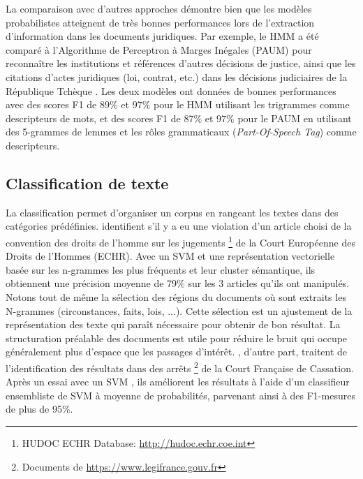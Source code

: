 La comparaison avec d'autres approches démontre bien que les modèles probabilistes atteignent de très bonnes performances lors de l'extraction d'information dans les documents juridiques. Par exemple, le HMM a été comparé à l'Algorithme de Perceptron à Marges Inégales (PAUM) \citep{li2002PAUM} pour reconnaître les institutions et références d'autres décisions de justice, ainsi que les citations d'actes juridiques (loi, contrat, etc.) dans les décisions judiciaires de la République Tchèque \citep{Kriz2014nerinczechdecisions}. Les deux modèles ont données de bonnes performances avec des scores F1 de $ 89 \% $ et $ 97 \% $ pour le HMM utilisant les trigrammes comme descripteurs de mots, et des scores F1 de $ 87 \% $ et $ 97 \% $ pour le PAUM en utilisant des 5-grammes de lemmes et les rôles grammaticaux (\textit{Part-Of-Speech Tag}) comme descripteurs. 


\subsection{Classification de texte}
La classification permet d'organiser un corpus en rangeant les textes dans des catégories prédéfinies.  \cite{Aletras2016predictDecisionECHR} identifient s'il y a eu une violation d'un article choisi de la convention des droits de l'homme sur les jugements \footnote{HUDOC ECHR Database: \url{http://hudoc.echr.coe.int}} de la Court Européenne des Droits de l'Hommes (ECHR). Avec un SVM et une représentation vectorielle basée sur les n-grammes les plus fréquents et leur cluster sémantique, ils obtiennent une précision moyenne de 79\% sur les 3 articles qu'ils ont manipulés. Notons tout de même la sélection des régions du documents où sont extraits les N-grammes (circonstances, faits, lois, ...). Cette sélection est un ajustement de la représentation des texte qui paraît nécessaire pour obtenir de bon résultat. La structuration préalable des documents est utile pour réduire le bruit qui occupe généralement plus d'espace que les passages d'intérêt. \cite{sulea2017legalEnsSVM}, d'autre part, traitent de l'identification des résultats dans des arrêts \footnote{Documents de \url{https://www.legifrance.gouv.fr}} de la Court Française de Cassation. Après un essai avec un SVM \citep{Sulea2017predictareadecision}, ils améliorent les résultats à l'aide d'un classifieur ensembliste de SVM à moyenne de probabilités, parvenant ainsi à des F1-mesures de plus de 95\%. 

